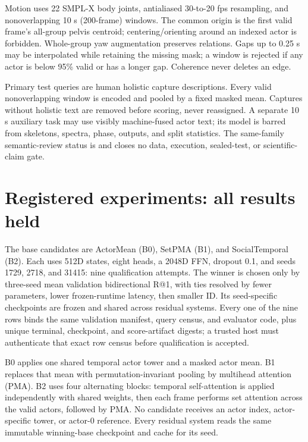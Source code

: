 \documentclass{article}
\begin{document}
Motion uses 22 SMPL-X body joints, antialiased 30-to-20 fps resampling, and
nonoverlapping 10 s (200-frame) windows. The common origin is the first valid
frame's all-group pelvis centroid; centering/orienting around an indexed actor
is forbidden. Whole-group yaw augmentation preserves relations. Gaps up to
0.25 s may be interpolated while retaining the missing mask; a window is
rejected if any actor is below 95\% valid or has a longer gap. Coherence never
deletes an edge.

Primary test queries are human holistic capture descriptions. Every valid
nonoverlapping window is encoded and pooled by a fixed masked mean. Captures
without holistic text are removed before scoring, never reassigned. A separate
10 s auxiliary task may use visibly machine-fused actor text; its model is
barred from skeletons, spectra, phase, outputs, and split statistics. The
same-family semantic-review status is
 and closes no
data, execution, sealed-test, or scientific-claim gate.

\section{Registered experiments: all results held}
The base candidates are ActorMean (B0), SetPMA (B1), and SocialTemporal (B2).
Each uses 512D states, eight heads, a 2048D FFN, dropout 0.1, and seeds 1729,
2718, and 31415: nine qualification attempts. The winner is chosen only by
three-seed mean validation bidirectional R@1, with ties resolved by fewer
parameters, lower frozen-runtime latency, then smaller ID. Its seed-specific
checkpoints are frozen and shared across residual systems. Every one of the
nine rows binds the same validation manifest, query census, and evaluator code,
plus unique terminal, checkpoint, and score-artifact digests; a trusted host
must authenticate that exact row census before qualification is accepted.

B0 applies one shared temporal actor tower and a masked actor mean. B1 replaces
that mean with permutation-invariant pooling by multihead attention (PMA). B2
uses four alternating blocks: temporal self-attention is applied independently
with shared weights, then each frame performs set attention across the valid
actors, followed by PMA. No candidate receives an actor index, actor-specific
tower, or actor-0 reference. Every residual system reads the same immutable
winning-base checkpoint and cache for its seed.
\end{document}
